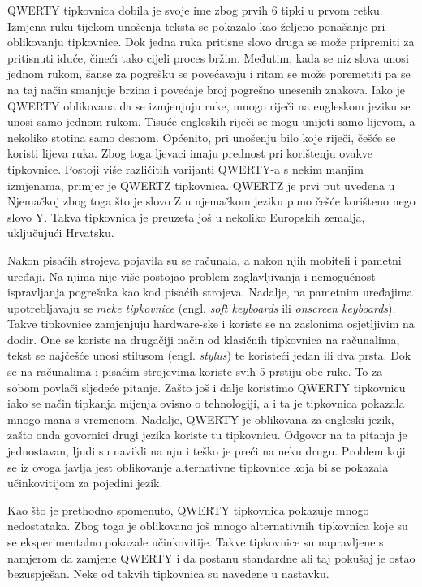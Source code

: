 \documentclass[times, utf8, zavrsni, numeric]{fer}
\begin{document}
QWERTY tipkovnica dobila je svoje ime zbog prvih 6 tipki u prvom retku. Izmjena ruku tijekom unošenja teksta se pokazalo kao željeno ponašanje pri oblikovanju tipkovnice. Dok jedna ruka pritisne slovo druga se može pripremiti za pritisnuti iduće, čineći tako cijeli proces bržim. Međutim, kada se niz slova unosi jednom rukom, šanse za pogrešku se povećavaju i ritam se može poremetiti pa se na taj način smanjuje brzina i povećaje broj pogrešno unesenih znakova. Iako je QWERTY oblikovana da se izmjenjuju ruke, mnogo riječi na engleskom jeziku se unosi samo jednom rukom. Tisuće engleskih riječi se mogu unijeti samo lijevom, a nekoliko stotina samo desnom. Općenito, pri unošenju bilo koje riječi, češće se koristi lijeva ruka. Zbog toga ljevaci imaju prednost pri korištenju ovakve tipkovnice. Postoji više različitih varijanti QWERTY-a s nekim manjim izmjenama, primjer je QWERTZ tipkovnica. QWERTZ je prvi put uvedena u Njemačkoj zbog toga što je slovo Z u njemačkom jeziku puno češće korišteno nego slovo Y. Takva tipkovnica je preuzeta još u nekoliko Europskih zemalja, uključujući Hrvatsku.

Nakon pisaćih strojeva pojavila su se računala, a nakon njih mobiteli i pametni uređaji. Na njima nije više postojao problem zaglavljivanja i nemogućnost ispravljanja pogrešaka kao kod pisaćih strojeva. Nadalje, na pametnim uređajima upotrebljavaju se \emph{meke tipkovnice} (engl. \emph{soft keyboards} ili \emph{onscreen keyboards}). Takve tipkovnice zamjenjuju hardware-ske i koriste se na zaslonima osjetljivim na dodir. One se koriste na drugačiji način od klasičnih tipkovnica na računalima, tekst se najčešće unosi stilusom (engl. \emph{stylus}) te koristeći jedan ili dva prsta. Dok se na računalima i pisaćim strojevima koriste svih 5 prstiju obe ruke. To za sobom povlači sljedeće pitanje. Zašto još i dalje koristimo QWERTY tipkovnicu iako se način tipkanja mijenja ovisno o tehnologiji, a i ta je tipkovnica pokazala mnogo mana s vremenom. Nadalje, QWERTY je oblikovana za engleski jezik, zašto onda govornici drugi jezika koriste tu tipkovnicu. Odgovor na ta pitanja je jednostavan, ljudi su navikli na nju i teško je preći na neku drugu. Problem koji se iz ovoga javlja jest oblikovanje alternativne tipkovnice koja bi se pokazala učinkovitijom za pojedini jezik.

Kao što je prethodno spomenuto, QWERTY tipkovnica pokazuje mnogo nedostataka. Zbog toga je oblikovano još mnogo alternativnih tipkovnica koje su se eksperimentalno pokazale učinkovitije. Takve tipkovnice su napravljene s namjerom da zamjene QWERTY i da postanu standardne ali taj pokušaj je ostao bezuspješan. Neke od takvih tipkovnica su navedene u nastavku.
\end{document}
